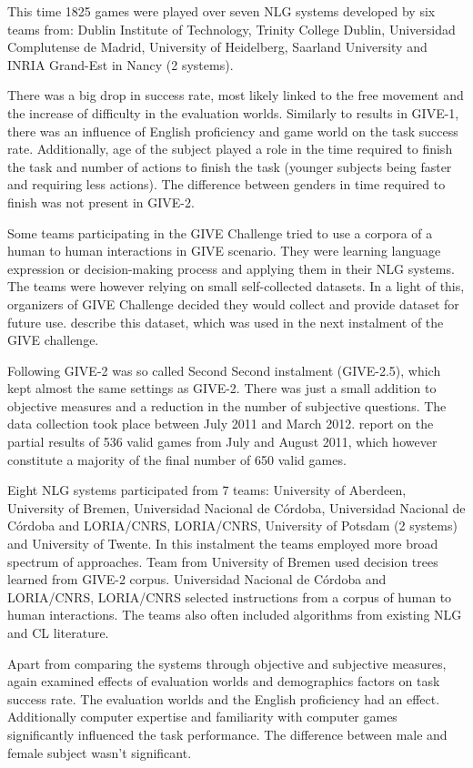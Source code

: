 This time 1825 games were played over seven NLG systems developed by six teams from: Dublin Institute of Technology, Trinity College Dublin, Universidad Complutense de Madrid, University of Heidelberg, Saarland University and INRIA Grand-Est in Nancy (2 systems).

There was a big drop in success rate, most likely linked to the free movement and the increase of difficulty in the evaluation worlds. Similarly to results in GIVE-1, there was an influence of English proficiency and game world on the task success rate. Additionally, age of the subject played a role in the time required to finish the task and number of actions to finish the task (younger subjects being faster and requiring less actions). The difference between genders in time required to finish was not present in GIVE-2.

Some teams participating in the GIVE Challenge tried to use a corpora of a human to human interactions in GIVE scenario. They were learning language expression or decision-making process and applying them in their NLG systems. The teams were however relying on small self-collected datasets. In a light of this, organizers of GIVE Challenge decided they would collect and provide dataset for future use. \citet{gargett2010give} describe this dataset, which was used in the next instalment of the GIVE challenge.

Following GIVE-2 was so called Second Second instalment (GIVE-2.5), which kept almost the same settings as GIVE-2. There was just a small addition to objective measures and a reduction in the number of subjective questions. The data collection took place between July 2011 and March 2012. \citet{striegnitz2011report} report on the partial results of 536 valid games from July and August 2011, which however constitute a majority of the final number of 650 valid games.

Eight NLG systems participated from 7 teams: University of Aberdeen, University of Bremen, Universidad Nacional de Córdoba, Universidad Nacional de Córdoba and LORIA/CNRS, LORIA/CNRS, University of Potsdam (2 systems) and University of Twente. In this instalment the teams employed more broad spectrum of approaches. Team from University of Bremen used decision trees learned from GIVE-2 corpus. Universidad Nacional de Córdoba and LORIA/CNRS, LORIA/CNRS selected instructions from a corpus of human to human interactions. The teams also often included algorithms from existing NLG and CL literature.

Apart from comparing the systems through objective and subjective measures, \citet{striegnitz2011report} again examined effects of evaluation worlds and demographics factors on task success rate. The evaluation worlds and the English proficiency had an effect. Additionally computer expertise and familiarity with computer games significantly influenced the task performance. The difference between male and female subject wasn't significant.

